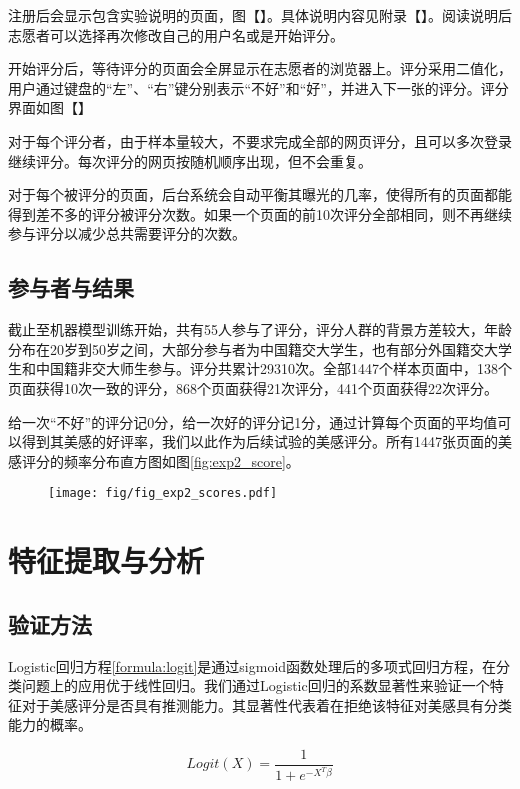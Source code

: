 注册后会显示包含实验说明的页面，图【】。具体说明内容见附录【】。阅读说明后志愿者可以选择再次修改自己的用户名或是开始评分。

开始评分后，等待评分的页面会全屏显示在志愿者的浏览器上。评分采用二值化，用户通过键盘的“左”、“右”键分别表示“不好”和“好”，并进入下一张的评分。评分界面如图【】

对于每个评分者，由于样本量较大，不要求完成全部的网页评分，且可以多次登录继续评分。每次评分的网页按随机顺序出现，但不会重复。

对于每个被评分的页面，后台系统会自动平衡其曝光的几率，使得所有的页面都能得到差不多的评分被评分次数。如果一个页面的前10次评分全部相同，则不再继续参与评分以减少总共需要评分的次数。

\subsection{参与者与结果}
截止至机器模型训练开始，共有55人参与了评分，评分人群的背景方差较大，年龄分布在20岁到50岁之间，大部分参与者为中国籍交大学生，也有部分外国籍交大学生和中国籍非交大师生参与。评分共累计29310次。全部1447个样本页面中，138个页面获得10次一致的评分，868个页面获得21次评分，441个页面获得22次评分。

给一次“不好”的评分记0分，给一次好的评分记1分，通过计算每个页面的平均值可以得到其美感的好评率，我们以此作为后续试验的美感评分。所有1447张页面的美感评分的频率分布直方图如图\ref{fig:exp2_score}。

\begin{figure}[H]
  \texttt{[image: fig/fig\_exp2\_scores.pdf]}
\end{figure}

\section{特征提取与分析}
\subsection{验证方法}
Logistic回归方程\ref{formula:logit}是通过sigmoid函数处理后的多项式回归方程，在分类问题上的应用优于线性回归。我们通过Logistic回归的系数显著性来验证一个特征对于美感评分是否具有推测能力。其显著性代表着在拒绝该特征对美感具有分类能力的概率。

\begin{equation}
  Logit(X) = \frac{1}{1 + e^{-X^{T}\beta}}
  \label{formula:logit}
\end{equation}

